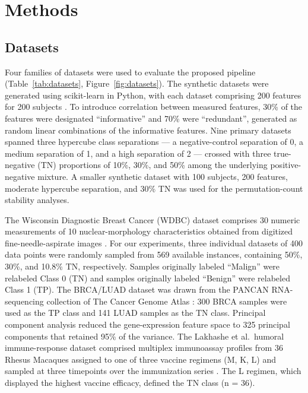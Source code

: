 \documentclass[11pt]{article}
\begin{document}
\section{Methods}

\subsection{Datasets}

Four families of datasets were used to evaluate the proposed pipeline (Table~\ref{tab:datasets}, Figure~\ref{fig:datasets}). The synthetic datasets were generated using scikit-learn in Python, with each dataset comprising 200 features for 200 subjects \cite{pedregosa2011scikit}. To introduce correlation between measured features, 30\% of the features were designated ``informative'' and 70\% were ``redundant'', generated as random linear combinations of the informative features. Nine primary datasets spanned three hypercube class separations --- a negative-control separation of 0, a medium separation of 1, and a high separation of 2 --- crossed with three true-negative (TN) proportions of 10\%, 30\%, and 50\% among the underlying positive-negative mixture. A smaller synthetic dataset with 100 subjects, 200 features, moderate hypercube separation, and 30\% TN was used for the permutation-count stability analyses.

The Wisconsin Diagnostic Breast Cancer (WDBC) dataset comprises 30 numeric measurements of 10 nuclear-morphology characteristics obtained from digitized fine-needle-aspirate images \cite{wolberg1999nuclear,wolberg2002computer}. For our experiments, three individual datasets of 400 data points were randomly sampled from 569 available instances, containing 50\%, 30\%, and 10.8\% TN, respectively. Samples originally labeled ``Malign'' were relabeled Class 0 (TN) and samples originally labeled ``Benign'' were relabeled Class 1 (TP). The BRCA/LUAD dataset was drawn from the PANCAN RNA-sequencing collection of The Cancer Genome Atlas \cite{weinstein2013tcga}: 300 BRCA samples were used as the TP class and 141 LUAD samples as the TN class. Principal component analysis reduced the gene-expression feature space to 325 principal components that retained 95\% of the variance. The Lakhashe et al.\ humoral immune-response dataset comprised multiplex immunoassay profiles from 36 Rhesus Macaques assigned to one of three vaccine regimens (M, K, L) and sampled at three timepoints over the immunization series \cite{lakhashe2022virosomal,marasini2021enshivig,malherbe2021adenovirus}. The L regimen, which displayed the highest vaccine efficacy, defined the TN class (n = 36).
\end{document}
